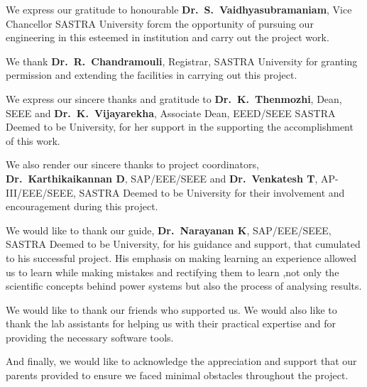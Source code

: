 \documentclass[a4paper, 12pt, oneside]{sastra}
\begin{document}
	\hspace*{12pt} We express our gratitude to honourable \textbf{Dr.~S.~Vaidhyasubramaniam}, Vice Chancellor SASTRA University forcm the opportunity of pursuing our engineering in this esteemed in institution and carry out the project work.
	
	\par We thank \textbf{Dr.~R.~Chandramouli}, Registrar, SASTRA University for granting permission and extending the facilities in carrying out this project.
	
	\par We express our sincere thanks and gratitude to \textbf{Dr.~K.~Thenmozhi}, Dean, SEEE and \textbf{Dr.~K.~Vijayarekha}, Associate Dean, EEED/SEEE SASTRA Deemed to be University, for her support in the supporting the accomplishment of this work.
	
	\par We also render our sincere thanks to project coordinators, \textbf{Dr.~Karthikaikannan D}, SAP/EEE/SEEE and \textbf{Dr.~Venkatesh T}, AP-III/EEE/SEEE, SASTRA Deemed to be University for their involvement and encouragement during this project.
	
	\par We would like to thank our guide, \textbf{Dr.~Narayanan K}, SAP/EEE/SEEE, SASTRA Deemed to be University, for his guidance and support, that cumulated to his successful project. His emphasis on making learning an experience allowed us to learn while making mistakes and rectifying them to learn ,not only the scientific concepts behind power systems but also the process of analysing results.
	
	\par We would like to thank our friends who supported us. We would also like to thank the lab assistants for helping us with their practical expertise and for providing the necessary software tools.
	
	\par And finally, we would like to acknowledge the appreciation and support that our parents provided to ensure we faced minimal obstacles throughout the project.
	\pagebreak
	
	\abstract
	
	
	\vspace*{24pt}
	
\end{document}

